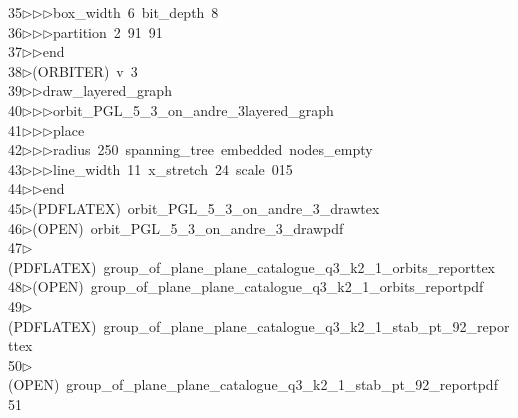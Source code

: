 \begin{tabbing}
35\>$\triangleright$\>$\triangleright$\>$\triangleright$\>box\_width\ 6\ bit\_depth\ 8\ \\[0pt]
36\>$\triangleright$\>$\triangleright$\>$\triangleright$\>partition\ 2\ 91\ 91\ \\[0pt]
37\>$\triangleright$\>$\triangleright$\>end\\[0pt]
38\>$\triangleright$\>(ORBITER)\ v\ 3\ \\[0pt]
39\>$\triangleright$\>$\triangleright$\>draw\_layered\_graph\ \\[0pt]
40\>$\triangleright$\>$\triangleright$\>$\triangleright$\>orbit\_PGL\_5\_3\_on\_andre\_3layered\_graph\ \\[0pt]
41\>$\triangleright$\>$\triangleright$\>$\triangleright$\>place\ \\[0pt]
42\>$\triangleright$\>$\triangleright$\>$\triangleright$\>radius\ 250\ spanning\_tree\ embedded\ nodes\_empty\ \\[0pt]
43\>$\triangleright$\>$\triangleright$\>$\triangleright$\>line\_width\ 11\ x\_stretch\ 24\ scale\ 015\ \\[0pt]
44\>$\triangleright$\>$\triangleright$\>end\\[0pt]
45\>$\triangleright$\>(PDFLATEX)\ orbit\_PGL\_5\_3\_on\_andre\_3\_drawtex\\[0pt]
46\>$\triangleright$\>(OPEN)\ orbit\_PGL\_5\_3\_on\_andre\_3\_drawpdf\\[0pt]
47\>$\triangleright$\>(PDFLATEX)\ group\_of\_plane\_plane\_catalogue\_q3\_k2\_1\_orbits\_reporttex\\[0pt]
48\>$\triangleright$\>(OPEN)\ group\_of\_plane\_plane\_catalogue\_q3\_k2\_1\_orbits\_reportpdf\\[0pt]
49\>$\triangleright$\>(PDFLATEX)\ group\_of\_plane\_plane\_catalogue\_q3\_k2\_1\_stab\_pt\_92\_reporttex\\[0pt]
50\>$\triangleright$\>(OPEN)\ group\_of\_plane\_plane\_catalogue\_q3\_k2\_1\_stab\_pt\_92\_reportpdf\\[0pt]
51\>\end{tabbing}
